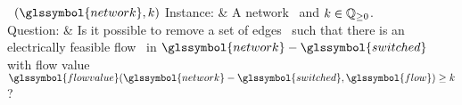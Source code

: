 \begin{problem}[framed]{\kMTSFP~\kmtsfp$(\glssymbol{network},k)$} 
    Instance: & A network~ and
    $k\in\mathbb{Q}_{\ge 0}$.\\
    Question: & Is it possible to remove a set of edges~ such
    that there is an electrically feasible flow~ in
    $\glssymbol{network}-\glssymbol{switched}$ with flow
    value~$\glssymbol{flowvalue}( \glssymbol{network} - 
    \glssymbol{switched}, \glssymbol{flow}) \geq k$?%
\end{problem} 
